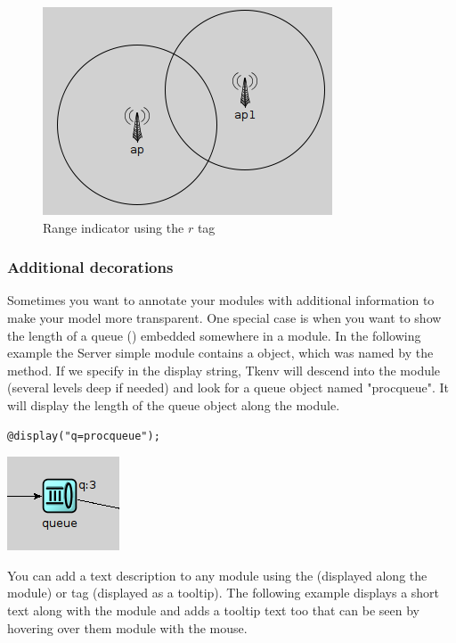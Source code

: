 \begin{figure}[htbp]
  \begin{center}
    \includegraphics{figures/graphics-rtag}
    \caption{Range indicator using the $r$ tag}
    \label{fig:graphics-rtag}
  \end{center}
\end{figure}

\subsubsection{Additional decorations}
Sometimes you want to annotate your modules with additional information
to make your model more transparent. One special case is when you want to
show the length of a queue () embedded somewhere in a module.
In the following example the Server simple module contains a  object,
which was named by the  method.
If we specify  in the display string, Tkenv will descend into
the module (several levels deep if needed) and look for a queue object
named "procqueue". It will display the length of the queue object along the module.
\begin{verbatim}
@display("q=procqueue");
\end{verbatim}

\begin{center}
\includegraphics{figures/graphics-qtag}
\end{center}

You can add a text description to any module using the 
(displayed along the module) or  tag (displayed as a tooltip).
The following example displays a short text along with the module
and adds a tooltip text too that can be seen by hovering over
them module with the mouse.

